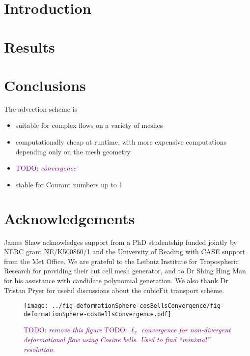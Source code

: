 \documentclass[times]{elsarticle}
\newcommand{\TODO}[1]{\textcolor{purple}{TODO: \emph{#1}}}
\begin{document}
\section{Introduction}




\section{Results}
\label{sec:results}





\section{Conclusions}

The advection scheme is
\begin{itemize}
	\item suitable for complex flows on a variety of meshes
	\item computationally cheap at runtime, with more expensive computations depending only on the mesh geometry
	\item \TODO{convergence}
	\item stable for Courant numbers up to 1
\end{itemize}

\section{Acknowledgements}
James Shaw acknowledges support from a PhD studentship funded jointly by NERC grant NE/K500860/1 and the University of Reading with CASE support from the Met Office.
We are grateful to the Leibniz Institute for Tropospheric Research for providing their cut cell mesh generator, and to Dr Shing Hing Man for his assistance with candidate polynomial generation.  We also thank Dr Tristan Pryer for useful discussions about the cubicFit transport scheme.








\begin{figure}
	\centering
	\texttt{[image: ../fig-deformationSphere-cosBellsConvergence/fig-deformationSphere-cosBellsConvergence.pdf]}
	\caption{\TODO{remove this figure}  \TODO{$\ell_2$ convergence for non-divergent deformational flow using Cosine bells.  Used to find ``minimal'' resolution.}}
\end{figure}
\end{document}
